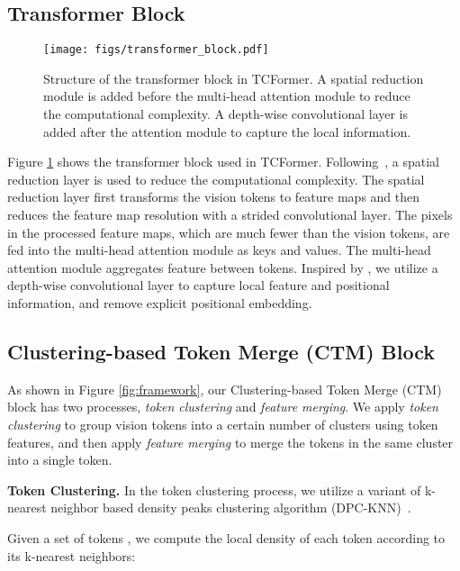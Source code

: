 \documentclass[10pt,twocolumn,letterpaper]{article}
\begin{document}
\subsection{Transformer Block}
\label{sec:transformerblock}

\begin{figure}[t]
	\centering
	\texttt{[image: figs/transformer\_block.pdf]}
	\caption{
	Structure of the transformer block in TCFormer.
	A spatial reduction module is added before the multi-head attention module to reduce the computational complexity. 
	A depth-wise convolutional layer is added after the attention module to capture the local information.
	}
	\label{fig:block}
	\vspace{-2mm}
\end{figure}


Figure \ref{fig:block} shows the transformer block used in TCFormer.
Following~\cite{pvt},  a spatial reduction layer is used to reduce the computational complexity.
The spatial reduction layer first transforms the vision tokens to feature maps and then reduces the feature map resolution with a strided convolutional layer. 
The pixels in the processed feature maps, which are much fewer than the vision tokens, are fed into the multi-head attention module as keys and values.
The multi-head attention module aggregates feature between tokens.
Inspired by \cite{localvit,cvt,yuan2021hrformer}, we utilize a depth-wise convolutional layer to capture local feature and positional information, and remove explicit positional embedding.



\subsection{Clustering-based Token Merge (CTM) Block}
\label{sec:CTM}
As shown in Figure \ref{fig:framework}, our Clustering-based Token Merge (CTM) block has two processes, \ie \emph{token clustering} and \emph{feature merging}.
We apply \emph{token clustering} to group vision tokens into a certain number of clusters using token features, and then apply \emph{feature merging} to merge the tokens in the same cluster into a single token.

\textbf{Token Clustering.}
In the token clustering process, we utilize a variant of k-nearest neighbor based density peaks clustering algorithm (DPC-KNN)~\cite{du2016study}. 

Given a set of tokens , we compute the local density  of each token according to its k-nearest neighbors:
\end{document}
